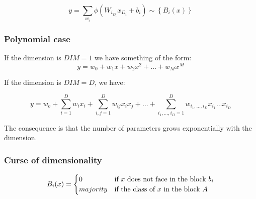         
            



$$
y = \sum_{w_i} \phi(W_{i_{D_i}} x_{D_i} + b_i) \sim \left\{B_i(x)\right\}
$$

\subsubsection{Polynomial case}

If the dimension is $DIM = 1$ we have something of the form:
$$
y = w_0 + w_1 x + w_2 x^2 + \dots + w_M x^M
$$

If the dimension is $DIM = D$, we have:

$$
y = w_o + \sum_{i = 1}^D w_ix_i + \sum_{i,j = 1}^D w_{ij}x_ix_j + \dots + \sum_{i_1, \dots, i_D = 1}^D w_{i_1, \dots, i_D}x_{i_1} \dots x_{i_D}
$$

The consequence is that the number of parameters grows exponentially with the dimension.

\subsubsection{Curse of dimensionality}

$$
B_i(x) = 
\begin{cases}
    0 & \text{if $x$ does not face in the block $b_i$}\\
    majority & \text{if the class of $x$ in the block $ A$}
\end{cases}
$$

